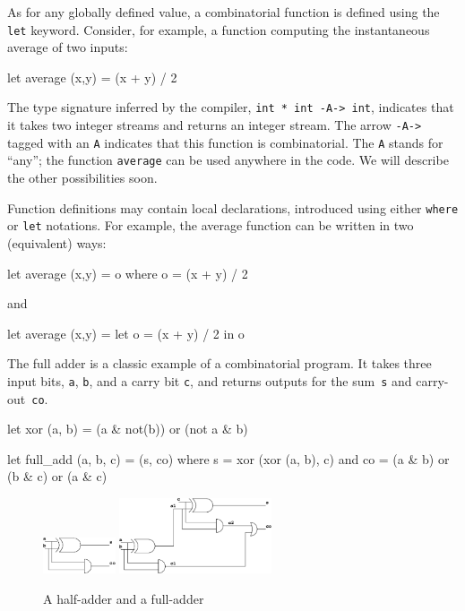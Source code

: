 \documentclass[11pt,titlepage,twoside]{report}
\newcommand{\zls}[1]{\texttt{#1}}
\newcommand{\zlsmsg}[1]{\texttt{#1}}
\begin{document}
As for any globally defined value, a combinatorial function
is defined using the \zls{let} keyword.
Consider, for example, a function computing the
instantaneous average of two inputs:
\begin{chklisting}[withresult]
let average (x,y) = (x + y) / 2
\end{chklisting}
The type signature inferred by the compiler, \zlsmsg{int * int -A-> int},
indicates that it takes two integer streams and returns an integer stream.
The arrow \texttt{-A->} tagged with an \texttt{A} indicates that this 
function is combinatorial.
The \texttt{A} stands for ``any''; the function \texttt{average} can be used 
anywhere in the code.
We will describe the other possibilities soon.

Function definitions may contain local declarations, introduced using
either \zls{where} or \zls{let} notations. For example, the average function 
can be written in two (equivalent) ways:
\begin{chklisting}
let average (x,y) = o where o = (x + y) / 2
\end{chklisting}
and
\begin{chklisting}
let average (x,y) = let o = (x + y) / 2 in o
\end{chklisting}

The full adder is a classic example of a combinatorial program.
It takes three input bits, \zls{a}, \zls{b}, and a carry bit \zls{c}, and 
returns outputs for the sum~\zls{s} and carry-out~\zls{co}.
\begin{chklisting}[withresult,label=xor]
let xor (a, b) = (a & not(b)) or (not a & b)

let full_add (a, b, c) = (s, co) where
       s = xor (xor (a, b), c)
   and co = (a & b) or (b & c) or (a & c)
\end{chklisting}

\begin{figure}
\centering
\includegraphics[width=0.19\textwidth]{Fig/half_adder}
\hfil
\includegraphics[width=0.4\textwidth]{Fig/full_adder}
\caption{A half-adder and a full-adder~\label{half-adder}}
\end{figure}
\end{document}
